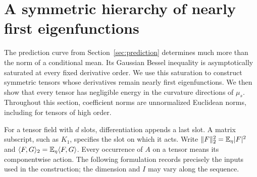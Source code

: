 \section{A symmetric hierarchy of nearly first eigenfunctions}
\label{sec:hierarchy}

The prediction curve from Section~\ref{sec:prediction} determines much more
than the norm of a conditional mean.  Its Gaussian Bessel inequality is
asymptotically saturated at every fixed derivative order.  We use this
saturation to construct symmetric tensors whose derivatives remain nearly
first eigenfunctions.  We then show that every tensor has negligible energy
in the curvature directions of $\mu_s$.  Throughout this section, coefficient
norms are unnormalized Euclidean norms, including for tensors of high order.

For a tensor field with $d$ slots, differentiation appends a last slot.  A
matrix subscript, such as $K_1$, specifies the slot on which it acts.  Write
$\|F\|_2^2=\mathbb E_\eta|F|^2$ and
$\langle F,G\rangle_2=\mathbb E_\eta\langle F,G\rangle$.  Every occurrence of $A$ on a
tensor means its componentwise action.  The following formulation records
precisely the inputs used in the construction; the dimension and $I$ may
vary along the sequence.

